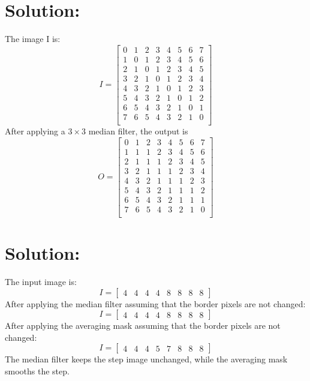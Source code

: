 \documentclass[12pt]{article}
\begin{document}
\section{Solution:}
The image I is:
\begin{equation*}
I={\left[ \begin{array}{cccccccc}
0 & 1 & 2 & 3 & 4 & 5 & 6 & 7\\
1 & 0 & 1 & 2 & 3 & 4 & 5 & 6\\
2 & 1 & 0 & 1 & 2 & 3 & 4 & 5\\
3 & 2 & 1 & 0 & 1 & 2 & 3 & 4\\
4 & 3 & 2 & 1 & 0 & 1 & 2 & 3\\
5 & 4 & 3 & 2 & 1 & 0 & 1 & 2\\
6 & 5 & 4 & 3 & 2 & 1 & 0 & 1\\
7 & 6 & 5 & 4 & 3 & 2 & 1 & 0\\
\end{array} \right]}
\end{equation*}
After applying a $3\times3$ median filter, the output is 
\begin{equation*}
O={\left[ \begin{array}{cccccccc}
0 & 1 & 2 & 3 & 4 & 5 & 6 & 7\\
1 & 1 & 1 & 2 & 3 & 4 & 5 & 6\\
2 & 1 & 1 & 1 & 2 & 3 & 4 & 5\\
3 & 2 & 1 & 1 & 1 & 2 & 3 & 4\\
4 & 3 & 2 & 1 & 1 & 1 & 2 & 3\\
5 & 4 & 3 & 2 & 1 & 1 & 1 & 2\\
6 & 5 & 4 & 3 & 2 & 1 & 1 & 1\\
7 & 6 & 5 & 4 & 3 & 2 & 1 & 0\\
\end{array} \right]}
\end{equation*}

\section{Solution:}
The input image is:
\begin{equation*}
I={\left[ \begin{array}{cccccccc}
4 & 4 & 4 & 4 & 8 & 8 & 8 & 8
\end{array} \right]}
\end{equation*}
After applying the median filter assuming that the border pixels are not changed:
\begin{equation*}
I={\left[ \begin{array}{cccccccc}
4 & 4 & 4 & 4 & 8 & 8 & 8 & 8
\end{array} \right]}
\end{equation*}
After applying the averaging mask assuming that the border pixels are not changed:
\begin{equation*}
I={\left[ \begin{array}{cccccccc}
4 & 4 & 4 & 5 & 7 & 8 & 8 & 8
\end{array} \right]}
\end{equation*}
The median filter keeps the step image unchanged, while the averaging mask smooths the step.
 
\end{document}

